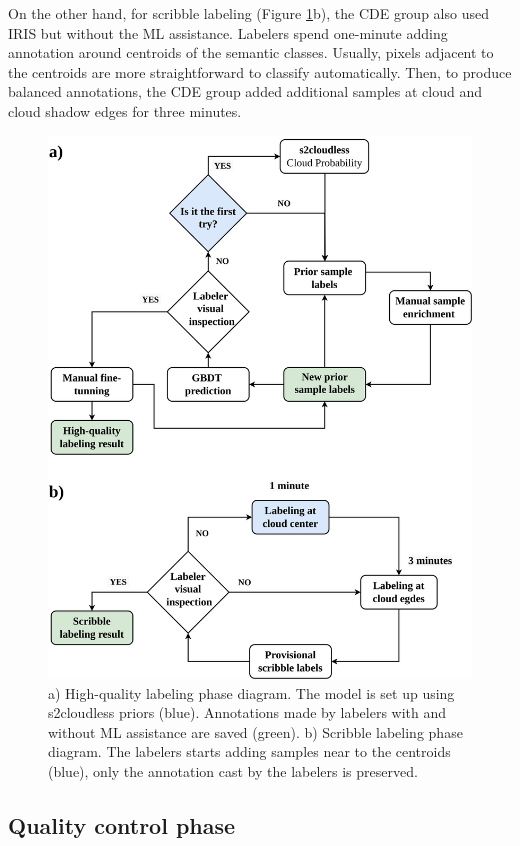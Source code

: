 \documentclass[a4paper, nobind]{templates/cdethesis}
\begin{document}
On the other hand, for scribble labeling (Figure \ref{fig:figure07}b), the CDE group also used IRIS but without the ML assistance. Labelers spend one-minute adding annotation around centroids of the semantic classes. Usually, pixels adjacent to the centroids are more straightforward to classify automatically. Then, to produce balanced annotations, the CDE group added additional samples at cloud and cloud shadow edges for three minutes.

\begin{figure}[!h]
    \centering
    \includegraphics[width=0.98\linewidth]{figures/chapter01/figure07.png}
    \caption{a) High-quality labeling phase diagram. The model is set up using s2cloudless priors (blue). Annotations made by labelers with and without ML assistance are saved (green). b) Scribble labeling phase diagram. The labelers starts adding samples near to the centroids (blue), only the annotation cast by the labelers is preserved.}
    \label{fig:figure07}
\end{figure}

\hypertarget{quality-control-phase}{%
\subsection{Quality control phase}\label{quality-control-phase}}
\end{document}
